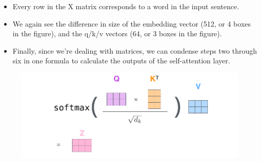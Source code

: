 \begin{itemize}
\item Every row in the X matrix corresponds to a word in the input sentence.
\item We again see the difference in size of the embedding vector (512, or 4 boxes in the figure), and the q/k/v vectors (64, or 3 boxes in the figure).


\item Finally, since we’re dealing with matrices, we can condense steps two through six in one formula to calculate the outputs of the self-attention layer.

\end{itemize}


\begin{figure}[h]
        	\includegraphics[scale = 0.35]{pics/self-attention-matrix-calculation-2.png}
        \end{figure} 




